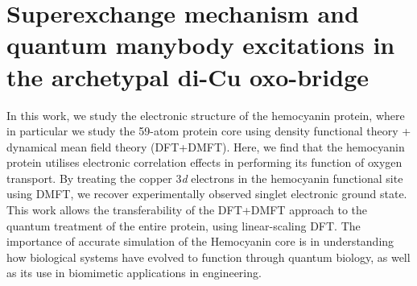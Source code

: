 \vspace{-1cm}
\chapter{Superexchange mechanism and quantum manybody excitations in the archetypal di-Cu oxo-bridge}
\label{Hemocyanin}
\vspace{-1cm}

In this work, we study the electronic structure of the hemocyanin protein, where in particular we study the 59-atom protein core using density functional theory + dynamical mean field theory (DFT+DMFT). Here, we find that the hemocyanin protein utilises electronic correlation effects in performing its function of oxygen transport. By treating the copper 3\textit{d} electrons in the hemocyanin functional site using DMFT, we recover experimentally observed singlet electronic ground state. This work allows the transferability of the DFT+DMFT approach to the quantum treatment of the entire protein, using linear-scaling DFT. The importance of accurate simulation of the Hemocyanin core is in understanding how biological systems have evolved to function through quantum biology, as well as its use in biomimetic applications in engineering.\cite{al2020superexchange} 

%


